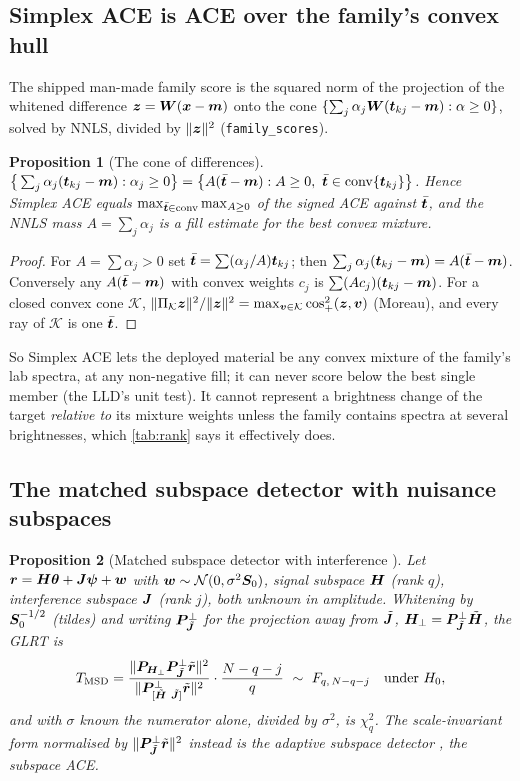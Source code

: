 \documentclass[11pt,a4paper]{article}
\theoremstyle{plain}
\newtheorem{proposition}{Proposition}[section]
\theoremstyle{definition}
\theoremstyle{remark}
\newcommand{\x}{\B{x}}
\newcommand{\tv}{\B{t}}
\newcommand{\rv}{\B{r}}
\newcommand{\zv}{\B{z}}
\newcommand{\Sm}{\B{S}}
\newcommand{\Wm}{\B{W}}
\newcommand{\Hm}{\B{H}}
\newcommand{\Jm}{\B{J}}
\newcommand{\Pm}{\B{P}}
\newcommand{\nrm}[1]{\lVert #1\rVert}
\begin{document}
\subsection{Simplex ACE is ACE over the family's convex hull}

The shipped man-made family score is the squared norm of the projection of the whitened difference
$\zv=\Wm(\x-\B m)$ onto the cone $\{\sum_j\alpha_j\Wm(\tv_{kj}-\B m):\alpha\ge0\}$, solved by NNLS, divided by
$\nrm{\zv}^2$ (\verb|family_scores|).

\begin{proposition}[The cone of differences]
\label{prop:cone}
$\big\{\sum_j\alpha_j(\tv_{kj}-\B m):\alpha_j\ge0\big\}=\big\{A(\bar{\tv}-\B m):A\ge0,\ \bar{\tv}\in\operatorname{conv}\{\tv_{kj}\}\big\}$.
Hence Simplex ACE equals $\max_{\bar{\tv}\in\operatorname{conv}}\max_{A\ge0}$ of the signed ACE against $\bar{\tv}$, and the
NNLS mass $A=\sum_j\alpha_j$ is a fill estimate for the best convex mixture.
\end{proposition}
\begin{proof}
For $A=\sum\alpha_j>0$ set $\bar{\tv}=\sum(\alpha_j/A)\tv_{kj}$; then $\sum_j\alpha_j(\tv_{kj}-\B m)=A(\bar{\tv}-\B m)$.
Conversely any $A(\bar{\tv}-\B m)$ with convex weights $c_j$ is $\sum (Ac_j)(\tv_{kj}-\B m)$. For a closed convex cone
$\mathcal K$, $\nrm{\Pi_{\mathcal K}\zv}^2/\nrm{\zv}^2=\max_{\B v\in\mathcal K}\cos^2_+(\zv,\B v)$ (Moreau), and every ray
of $\mathcal K$ is one $\bar{\tv}$.
\end{proof}

So Simplex ACE lets the deployed material be any convex mixture of the family's lab spectra, at any non-negative
fill; it can never score below the best single member (the LLD's unit test). It cannot represent a brightness change
of the target \emph{relative to} its mixture weights unless the family contains spectra at several brightnesses,
which \cref{tab:rank} says it effectively does.

\subsection{The matched subspace detector with nuisance subspaces}

\begin{proposition}[Matched subspace detector with interference \cite{ScharfFriedlander1994}]
\label{prop:msd}
Let $\rv=\Hm\B\theta+\Jm\B\psi+\B w$ with $\B w\sim\mathcal N(0,\sigma^2\Sm_0)$, signal subspace $\Hm$ (rank $q$),
interference subspace $\Jm$ (rank $j$), both unknown in amplitude. Whitening by $\Sm_0^{-1/2}$ (tildes) and writing
$\Pm_{\tilde{\Jm}}^\perp$ for the projection away from $\tilde{\Jm}$, $\Hm_\perp=\Pm^\perp_{\tilde{\Jm}}\tilde{\Hm}$, the GLRT is
\[
  T_{\rm MSD}=\frac{\nrm{\Pm_{\Hm_\perp}\Pm^\perp_{\tilde{\Jm}}\tilde{\rv}}^2}{\nrm{\Pm^\perp_{[\tilde{\Hm}\ \tilde{\Jm}]}\tilde{\rv}}^2}
  \cdot\frac{N-q-j}{q}\ \sim\ F_{q,\,N-q-j}\quad\text{under }H_0,
\]
and with $\sigma$ known the numerator alone, divided by $\sigma^2$, is $\chi^2_q$. The scale-invariant form normalised by
$\nrm{\Pm^\perp_{\tilde{\Jm}}\tilde{\rv}}^2$ instead is the adaptive subspace detector \cite{KrautScharfMcWhorter2001}, the
subspace ACE.
\end{proposition}
\end{document}
